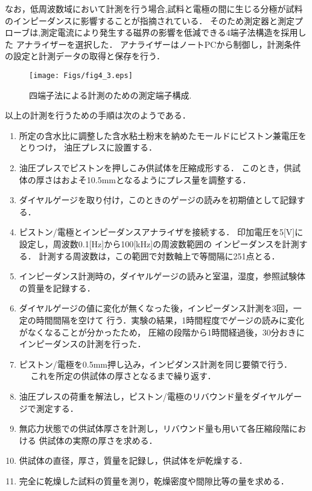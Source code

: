 なお，低周波数域において計測を行う場合,試料と電極の間に生じる分極が試料のインピーダンスに影響することが指摘されている．
そのため測定器と測定プローブは,測定電流により発生する磁界の影響を低減できる4端子法構造を採用した
アナライザーを選択した．
アナライザーはノートPCから制御し，計測条件の設定と計測データの取得と保存を行う．
\begin{figure}[h]
	\begin{center}
	\texttt{[image: Figs/fig4\_3.eps]} 
	\end{center}
	\caption{
		四端子法による計測のための測定端子構成.
	} 
	\label{fig:fig4_3}
\end{figure}
以上の計測を行うための手順は次のようである．
\begin{enumerate}
\item
	所定の含水比に調整した含水粘土粉末を納めたモールドにピストン兼電圧をとりつけ，
	油圧プレスに設置する．
\item
	油圧プレスでピストンを押しこみ供試体を圧縮成形する．
	このとき，供試体の厚さはおよそ10.5mmとなるようにプレス量を調整する．
\item
	ダイヤルゲージを取り付け，このときのゲージの読みを初期値として記録する．
\item
	ピストン/電極とインピーダンスアナライザを接続する．
	印加電圧を5[V]に設定し，周波数0.1[Hz]から100[kHz]の周波数範囲の
	インピーダンスを計測する．
	計測する周波数は，この範囲で対数軸上で等間隔に251点とる．
\item
	インピーダンス計測時の，ダイヤルゲージの読みと室温，湿度，参照試験体の質量を記録する．
\item
	ダイヤルゲージの値に変化が無くなった後，インピーダンス計測を3回，一定の時間間隔を空けて
	行う．実験の結果，1時間程度でゲージの読みに変化がなくなることが分かったため，
	圧縮の段階から1時間経過後，30分おきにインピーダンスの計測を行った．
\item
	ピストン/電極を0.5mm押し込み，インピダンス計測を同じ要領で行う．
　	これを所定の供試体の厚さとなるまで繰り返す．
\item
	油圧プレスの荷重を解法し，ピストン/電極のリバウンド量をダイヤルゲージで測定する．
\item
	無応力状態での供試体厚さを計測し，リバウンド量も用いて各圧縮段階における
	供試体の実際の厚さを求める．
\item
	供試体の直径，厚さ，質量を記録し，供試体を炉乾燥する．
\item
	完全に乾燥した試料の質量を測り，乾燥密度や間隙比等の量を求める．		
\end{enumerate}
